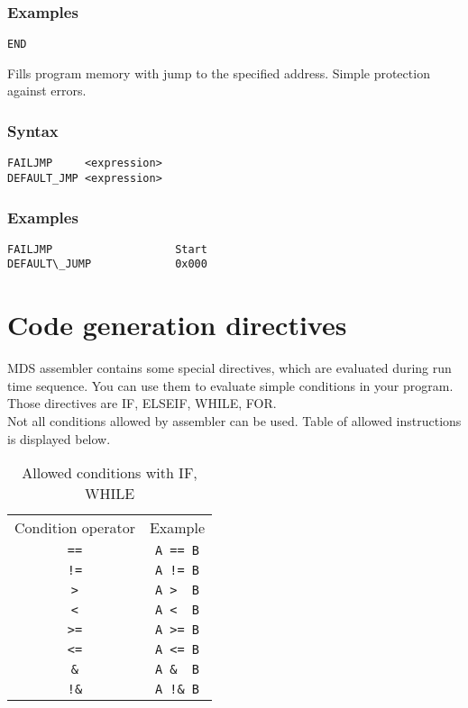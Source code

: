     \subsubsection{Examples}
            \verb'END'

    Fills program memory with jump to the specified address. Simple protection against errors.

    \subsubsection{Syntax}
        \verb'FAILJMP     <expression>'\\
        \verb'DEFAULT_JMP <expression>'

    \subsubsection{Examples}
        \verb'FAILJMP                   Start'\\
        \verb'DEFAULT\_JUMP             0x000'

\section{Code generation directives}
MDS assembler contains some special directives, which are evaluated during run time sequence. You can use them to evaluate simple conditions in your program. Those directives are IF, ELSEIF, WHILE, FOR.\\ Not all conditions allowed by assembler can be used. Table of allowed instructions is displayed below.

\begin{table}[h!]
    \mysmallfont{}
    \centering{}
    \begin{tabular}{|c|c|}
        \hline
        Condition operator & Example  \\
        \verb'=='          & \verb'A == B'  \\
        \verb'!='          & \verb'A != B'  \\
        \verb'>'           & \verb'A >  B'  \\
        \verb'<'           & \verb'A <  B'  \\
        \verb'>='          & \verb'A >= B'  \\
        \verb'<='          & \verb'A <= B'  \\
        \verb'&'           & \verb'A &  B'  \\
        \verb'!&'          & \verb'A !& B'  \\\hline
    \end{tabular}
    \caption{Allowed conditions with IF, WHILE}
\end{table}

